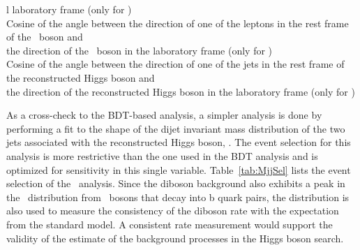 \documentclass[11pt,twoside,a4paper,cmspaper,final,collab]{cms-tdr}
\begin{document}
\begin{table}[tbp]
{\begin{scotch}{l}
laboratory frame  (only for \ZllH )\\
Cosine of the angle between the direction of one of the leptons in the
rest frame of the \cPZ\  boson and\\ \hspace{0.2in}  the direction of the \cPZ\  boson in the
laboratory frame  (only for \ZllH )\\
Cosine of the angle between the direction of one
of the jets in the rest frame of the reconstructed Higgs boson and\\\hspace{0.2in}  the
direction of the reconstructed Higgs boson in the laboratory frame  (only for \ZllH )\\
\end{scotch}}
\end{table}




As a cross-check to the BDT-based analysis, a simpler analysis is
done by performing a fit to the shape of the dijet invariant mass distribution
of the two jets associated with the reconstructed Higgs boson, \Mjj. The event
selection for this analysis is more
restrictive than the one used in the BDT analysis and is optimized for
sensitivity in this single variable. Table~\ref{tab:MjjSel} %
lists the event
selection of the \Mjj\ analysis. Since the diboson background also
exhibits a peak in the \Mjj\ distribution from \cPZ\  bosons that decay into
b quark pairs, the distribution is also used to measure the
consistency of the diboson rate with the expectation from the
standard model. A consistent rate measurement would support the
validity of the estimate of the background processes in the Higgs
boson search.
\end{document}
